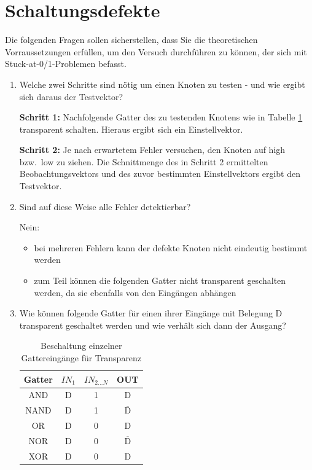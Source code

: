 \documentclass[10pt]{scrreprt}
\begin{document}
    \section{Schaltungsdefekte}
    Die folgenden Fragen sollen sicherstellen, dass Sie die theoretischen Vorraussetzungen
    erfüllen, um den Versuch durchführen zu können, der sich mit Stuck-at-0/1-Problemen
    befasst.
    \begin{enumerate}
        \item Welche zwei Schritte sind nötig um einen Knoten zu testen - und wie ergibt sich
            daraus der Testvektor?

            \textbf{Schritt 1:} Nachfolgende Gatter des zu testenden Knotens wie in Tabelle \ref{tab:transp}
            transparent schalten. Hieraus ergibt sich ein Einstellvektor.

            \textbf{Schritt 2:} Je nach erwartetem Fehler versuchen, den Knoten auf high bzw.~low zu
            ziehen. Die Schnittmenge des in Schritt 2 ermittelten Beobachtungsvektors und des
            zuvor bestimmten Einstellvektors ergibt den Testvektor.

        \item Sind auf diese Weise alle Fehler detektierbar?

            Nein:
            \begin{itemize}
                \item bei mehreren Fehlern kann der defekte Knoten nicht eindeutig bestimmt werden
                \item zum Teil können die folgenden Gatter nicht transparent geschalten werden, da sie ebenfalls von den Eingängen abhängen
            \end{itemize}
        \item Wie können folgende Gatter für einen ihrer Eingänge mit Belegung \glqq{}D\grqq{} transparent
            geschaltet werden und wie verhält sich dann der Ausgang?
            \begin{table}[H]
                \centering
                \begin{tabular}{c|c|c|c}
                    \toprule
                    Gatter & $IN_1$ & $IN_{2 \ldots N}$ & OUT\\
                    \midrule
                    AND & D & 1 & D\\
                    NAND & D & 1 & $\overline{\text{D}}$\\
                    OR & D & 0 & D\\
                    NOR & D & 0 & $\overline{\text{D}}$\\
                    XOR & D & 0 & D\\
                    \bottomrule
                \end{tabular}
                \caption{Beschaltung einzelner Gattereingänge für Transparenz}
                \label{tab:transp}
            \end{table}
    \end{enumerate}
\end{document}
